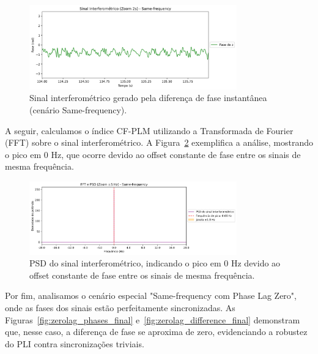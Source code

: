 \begin{figure}[htb]
    \centering
    \includegraphics[width=0.8\textwidth]{figs/3_2_testing_connectivity_metrics/13_Passo2_Interferometrico_Same-frequency.png}
    \caption{Sinal interferométrico gerado pela diferença de fase instantânea (cenário Same-frequency).}
    \label{fig:sinal_interferometrico_samefreq}
\end{figure}

A seguir, calculamos o índice CF-PLM utilizando a Transformada de Fourier (FFT) sobre o sinal interferométrico. A Figura~\ref{fig:fft_psd_samefreq} exemplifica a análise, mostrando o pico em 0 Hz, que ocorre devido ao offset constante de fase entre os sinais de mesma frequência.

\begin{figure}[htb]
    \centering
    \includegraphics[width=0.8\textwidth]{figs/3_2_testing_connectivity_metrics/14_Passo3_FFT_PSD_Same-frequency.png}
    \caption{PSD do sinal interferométrico, indicando o pico em 0 Hz devido ao offset constante de fase entre os sinais de mesma frequência.}
    \label{fig:fft_psd_samefreq}
\end{figure}

Por fim, analisamos o cenário especial "Same-frequency com Phase Lag Zero", onde as fases dos sinais estão perfeitamente sincronizadas. As Figuras~\ref{fig:zerolag_phases_final} e~\ref{fig:zerolag_difference_final} demonstram que, nesse caso, a diferença de fase se aproxima de zero, evidenciando a robustez do PLI contra sincronizações triviais.

